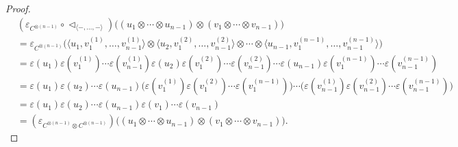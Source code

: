 \documentclass[a4paper,reqno,10pt]{amsart}
\theoremstyle{plain}
\theoremstyle{definition}
\theoremstyle{remark}
\begin{document}
\begin{proof}
\begin{align*}
         &(\varepsilon_{C^{\otimes (n-1)}} \circ \triangleleft_{\langle -, \ldots , - \rangle }) \big(   (u_1 \otimes \cdots \otimes u_{n-1}) \otimes (v_1 \otimes \cdots \otimes v_{n-1})   \big) \\
         &= \varepsilon_{C^{\otimes (n-1)}} \big(   \langle u_1, v_1^{(1)}, \ldots, v_{n-1}^{(1)} \rangle \otimes  \langle u_2, v_1^{(2)}, \ldots, v_{n-1}^{(2)} \rangle \otimes \cdots \otimes  \langle u_{n-1}, v_1^{(n-1)}, \ldots, v_{n-1}^{(n-1)} \rangle   \big) \\
         &= \varepsilon (u_1) \varepsilon (v_1^{(1)}) \cdots \varepsilon (v_{n-1}^{(1)}) 
         \varepsilon (u_2) \varepsilon (v_1^{(2)}) \cdots \varepsilon (v_{n-1}^{(2)}) \cdots \varepsilon (u_{n-1}) \varepsilon (v_1^{(n-1)}) \cdots \varepsilon (v_{n-1}^{(n-1)}) \\
         &= \varepsilon (u_1) \varepsilon (u_2) \cdots \varepsilon (u_{n-1}) \big(  \varepsilon (v_1^{(1)}) \varepsilon (v_1^{(2)}) \cdots \varepsilon (v_1^{(n-1)})    \big) \cdots \big(  \varepsilon (v_{n-1}^{(1)}) \varepsilon (v_{n-1}^{(2)}) \cdots \varepsilon (v_{n-1}^{(n-1)})   \big) \\
         &= \varepsilon (u_1) \varepsilon (u_2) \cdots \varepsilon (u_{n-1}) \varepsilon (v_1) \cdots \varepsilon (v_{n-1}) \\
         &= (\varepsilon_{C^{\otimes (n-1)} \otimes C^{\otimes (n-1)}}) \big(   (u_1 \otimes \cdots \otimes u_{n-1}) \otimes (v_1 \otimes \cdots \otimes v_{n-1})   \big).
     \end{align*}

     \medskip


\end{proof}
\end{document}

